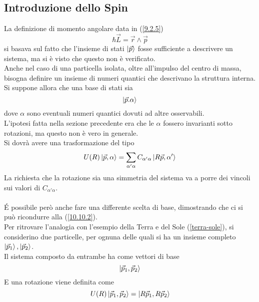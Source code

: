 \documentclass[twoside]{article}
\begin{document}
\vspace{0.5cm}
\subsection{Introduzione dello Spin}

La definizione di momento angolare data in (\ref{9.2.5})
\begin{equation}
    \hbar \Vec{L}=\Vec{r}\wedge\Vec{p}
\end{equation}
si basava sul fatto che l'insieme di stati $\ket{\Vec{p}}$ fosse sufficiente a descrivere un sistema, ma si è visto che questo non è verificato.
\\
Anche nel caso di una particella isolata, oltre all'impulso del centro di massa, bisogna definire un insieme di numeri quantici che descrivano la struttura interna.
\\
Si suppone allora che una base di stati sia
\begin{equation}\label{10.10.2}
    \ket{\Vec{p}.\alpha}
\end{equation}
dove $\alpha$ sono eventuali numeri quantici dovuti ad altre osservabili.
\\
L'ipotesi fatta nella sezione precedente era che le $\alpha$ fossero invarianti sotto rotazioni, ma questo non è vero in generale.
\\
Si dovrà avere una trasformazione del tipo
\begin{equation}\label{10.10.3}
    U(R)\ket{\Vec{p},\alpha}=\sum_{\alpha' \alpha}C_{\alpha' \alpha}\ket{R\Vec{p},\alpha'}
\end{equation}
La richiesta che la rotazione sia una simmetria del sistema va a porre dei vincoli sui valori di $C_{\alpha'\alpha}$.
\\ \\
\'E possibile però anche fare una differente scelta di base, dimostrando che ci si può ricondurre alla (\ref{10.10.2}).
\\
Per ritrovare l'analogia con l'esempio della Terra e del Sole (\ref{terra-sole}), si considerino due particelle, per ognuna delle quali si ha un insieme completo $\ket{\Vec{p}_1},\ket{\Vec{p}_2}$.
\\
Il sistema composto da entrambe ha come vettori di base
\begin{equation}
    \ket{\Vec{p}_1,\Vec{p}_2}
\end{equation}
E una rotazione viene definita come
\begin{equation}
    U(R)\ket{\Vec{p}_1,\Vec{p}_2}=\ket{R\Vec{p}_1,R\Vec{p}_2}
\end{equation}
\end{document}
